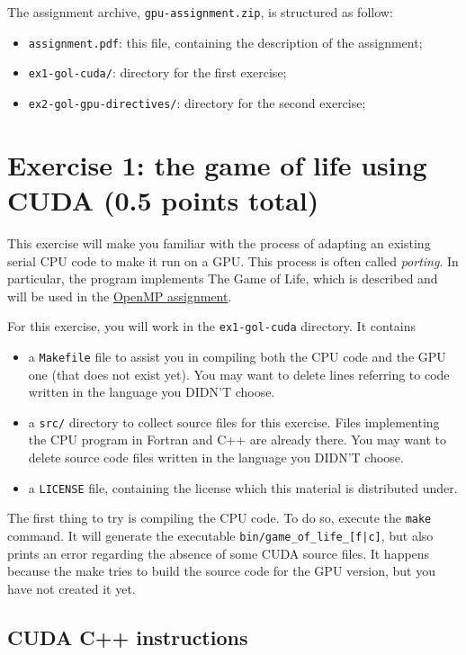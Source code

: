 \documentclass[a4paper, 11pt]{article}
\begin{document}
	The assignment archive, \texttt{gpu-assignment.zip}, is structured as follow:
	
	\begin{itemize}
		\item \texttt{assignment.pdf}: this file, containing the description of the assignment;
		\item \texttt{ex1-gol-cuda/}: directory for the first exercise;
		\item \texttt{ex2-gol-gpu-directives/}: directory for the second exercise;
	\end{itemize}


	\section{Exercise 1: the game of life using CUDA (0.5 points total)}
	
	This exercise will make you familiar with the process of adapting an existing serial CPU code to make it run on a GPU. This process is often called \textit{porting}. In particular, the program implements The Game of Life, which is described and will be used in the \href{https://internal.pawsey.org.au/share/s/Cc3Tm7DDR_Srd2YjUrTusw}{OpenMP assignment}.
	
	For this exercise, you will work in the \texttt{ex1-gol-cuda} directory. It contains 
	\begin{itemize}
		\item a \texttt{Makefile} file to assist you in compiling both the CPU code and the GPU one (that does not exist yet). You may want to delete lines referring to code written in the language you DIDN'T choose.
		\item a \texttt{src/} directory to collect source files for this exercise. Files implementing the CPU program in Fortran and C++ are already there. You may want to delete source code files written in the language you DIDN'T choose.
		\item a \texttt{LICENSE} file, containing the license which this material is distributed under.
	\end{itemize}
	
	The first thing to try is compiling the CPU code. To do so, execute the \texttt{make} command. It will generate the executable \texttt{bin/game\_of\_life\_[f|c]}, but also prints an error regarding the absence of some CUDA source files. It happens because the make tries to build the source code for the GPU version, but you have not created it yet.
	
	\subsection{CUDA C++ instructions}
	
\end{document}
